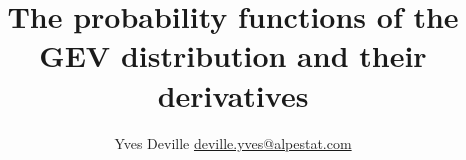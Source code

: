\documentclass[11pt]{article}
\title{The probability functions of the GEV distribution
  and their derivatives}
\author{Yves Deville \href{mailto:deville.yves@alpestat.com}%
  {deville.yves@alpestat.com} }
\begin{document}
\maketitle{}
\tableofcontents


\end{document}
